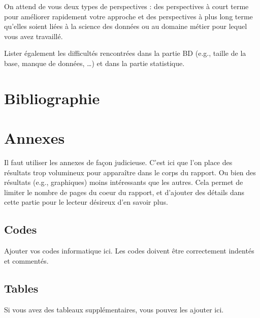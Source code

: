 \documentclass[mstat,12pt]{unswthesis}
\begin{document}
\bigskip

On attend de vous deux types de perspectives : des perspectives à court
terme pour améliorer rapidement votre approche et des perspectives à
plus long terme qu'elles soient liées à la science des données ou au
domaine métier pour lequel vous avez travaillé.

\bigskip

Lister également les difficultés rencontrées dans la partie BD (e.g.,
taille de la base, manque de données, \ldots) et dans la partie
statistique.

\chapter*{Bibliographie}\label{bibliographie}

\label{refs}




\chapter*{Annexes}\label{annexes}

Il faut utiliser les annexes de façon judicieuse. C'est ici que l'on
place des résultats trop volumineux pour apparaître dans le corps du
rapport. Ou bien des résultats (e.g., graphiques) moins intéressants que
les autres. Cela permet de limiter le nombre de pages du coeur du
rapport, et d'ajouter des détails dans cette partie pour le lecteur
désireux d'en savoir plus.

\section*{\texorpdfstring{\textbf{Codes}}{Codes}}\label{codes}

Ajouter vos codes informatique ici. Les codes doivent être correctement
indentés et commentés.

\section*{\texorpdfstring{\textbf{Tables}}{Tables}}\label{tables}

Si vous avez des tableaux supplémentaires, vous pouvez les ajouter ici.
\end{document}
